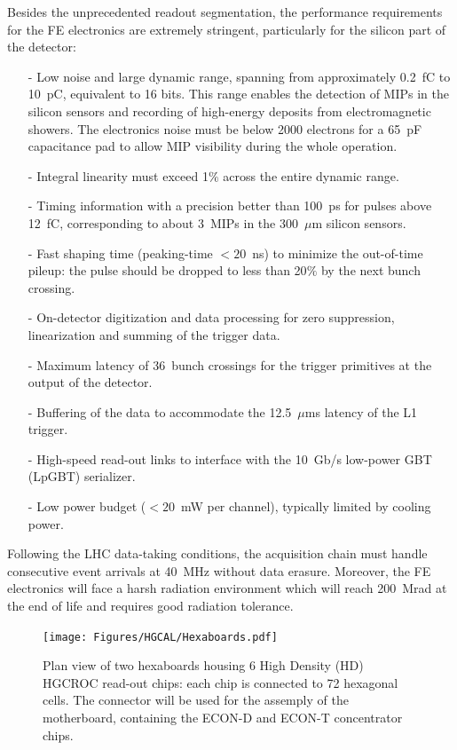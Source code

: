 Besides the unprecedented readout segmentation, the performance requirements for the FE electronics are extremely stringent, particularly for the silicon part of the detector:
\begin{itemize}
    \item [-] Low noise and large dynamic range, spanning from approximately 0.2~fC to 10~pC, equivalent to 16 bits. This range enables the detection of MIPs in the silicon sensors and recording of high-energy deposits from electromagnetic showers. 
    The electronics noise must be below 2000 electrons for a 65~pF capacitance pad to allow MIP visibility during the whole operation.
    \item [-] Integral linearity must exceed 1$\%$ across the entire dynamic range.
    \item [-] Timing information with a precision better than 100~ps for pulses above 12~fC, corresponding to about 3~MIPs in the 300~$\mu$m silicon sensors.
    \item [-] Fast shaping time (peaking-time $<20$~ns) to minimize the out-of-time pileup: the pulse should be dropped to less than 20$\%$ by the next bunch crossing.
    \item [-] On-detector digitization and data processing for zero suppression, linearization and summing of the trigger data.
    \item [-] Maximum latency of 36~bunch crossings for the trigger primitives at the output of the detector.
    \item [-] Buffering of the data to accommodate the 12.5~$\mu$ms latency of the L1 trigger.
    \item [-] High-speed read-out links to interface with the 10~Gb/s low-power GBT (LpGBT) serializer.
    \item [-] Low power budget ($<20$~mW per channel), typically limited by cooling power.
\end{itemize}

Following the LHC data-taking conditions, the acquisition chain must handle consecutive event arrivals at 40~MHz without data erasure.
Moreover, the FE electronics will face a harsh radiation environment which will reach 200~Mrad at the end of life and requires good radiation tolerance.

\begin{figure}
    \centering
    \texttt{[image: Figures/HGCAL/Hexaboards.pdf]}
    \caption{Plan view of two hexaboards housing 6 High Density (HD) HGCROC read-out chips: each chip is connected to 72 hexagonal cells. The connector will be used for the assemply of the motherboard, containing the ECON-D and ECON-T concentrator chips.}
    \label{fig:Hexaboards}
\end{figure}

